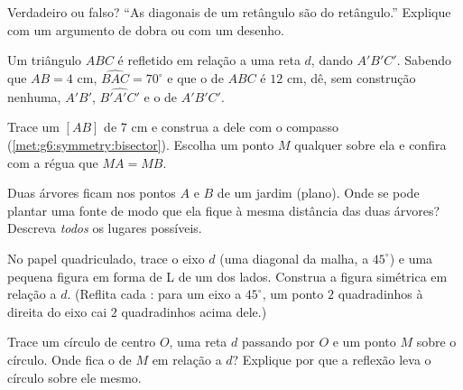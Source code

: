 \begin{exercise}[$\star$]\label{exo:g6:symmetry:5}
Verdadeiro ou falso? ``As diagonais de um retângulo são  do retângulo.'' Explique com um argumento de dobra ou com um
desenho.
\end{exercise}

\begin{exercise}[$\star$]\label{exo:g6:symmetry:6}
Um triângulo $ABC$ é refletido em relação a uma reta $d$, dando
$A'B'C'$. Sabendo que $AB = 4$ cm, $\widehat{BAC} = 70^\circ$ e que o
 de $ABC$ é $12$ cm, dê, sem construção nenhuma, $A'B'$,
$\widehat{B'A'C'}$ e o  de $A'B'C'$.
\end{exercise}

\begin{exercise}[$\star$]\label{exo:g6:symmetry:7}
Trace um  $[AB]$ de $7$ cm e construa a  dele com o
compasso (\cref{met:g6:symmetry:bisector}). Escolha um ponto $M$
qualquer sobre ela e confira com a régua que $MA = MB$.
\end{exercise}

\begin{exercise}[$\star\star$]\label{exo:g6:symmetry:8}
Duas árvores ficam nos pontos $A$ e $B$ de um jardim (plano). Onde se
pode plantar uma fonte de modo que ela fique à mesma distância das duas
árvores? Descreva \emph{todos} os lugares possíveis.
\end{exercise}

\begin{exercise}[$\star\star$]\label{exo:g6:symmetry:9}
No papel quadriculado, trace o eixo $d$ (uma diagonal da malha, a
$45^\circ$) e uma pequena figura em forma de L de um dos lados.
Construa a figura simétrica em relação a $d$. (Reflita cada :
para um eixo a $45^\circ$, um ponto $2$ quadradinhos à direita do eixo
cai $2$ quadradinhos acima dele.)
\end{exercise}

\begin{exercise}[$\star\star$]\label{exo:g6:symmetry:10}
Trace um círculo de centro $O$, uma reta $d$ passando por $O$ e um
ponto $M$ sobre o círculo. Onde fica o  de $M$ em relação a
$d$? Explique por que a reflexão leva o círculo sobre ele mesmo.
\end{exercise}

